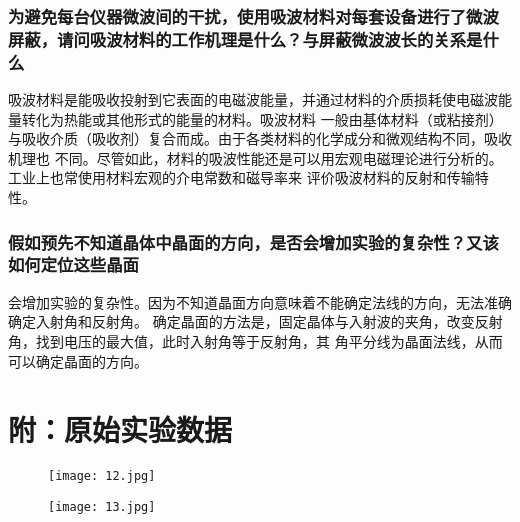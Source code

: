 \documentclass[12pt,a4paper]{article}
\begin{document}
    \subsubsection{为避免每台仪器微波间的干扰，使用吸波材料对每套设备进行了微波屏蔽，请问吸波材料的工作机理是什么？与屏蔽微波波长的关系是什么}
    吸波材料是能吸收投射到它表面的电磁波能量，并通过材料的介质损耗使电磁波能量转化为热能或其他形式的能量的材料。吸波材料
    一般由基体材料（或粘接剂）与吸收介质（吸收剂）复合而成。由于各类材料的化学成分和微观结构不同，吸收机理也
    不同。尽管如此，材料的吸波性能还是可以用宏观电磁理论进行分析的。工业上也常使用材料宏观的介电常数和磁导率来
    评价吸波材料的反射和传输特性。
    \subsubsection{假如预先不知道晶体中晶面的方向，是否会增加实验的复杂性？又该如何定位这些晶面}
    会增加实验的复杂性。因为不知道晶面方向意味着不能确定法线的方向，无法准确确定入射角和反射角。
    确定晶面的方法是，固定晶体与入射波的夹角，改变反射角，找到电压的最大值，此时入射角等于反射角，其
    角平分线为晶面法线，从而可以确定晶面的方向。

\section*{附：原始实验数据}
    \begin{figure}[H]
        \centering
        \texttt{[image: 12.jpg]}
    \end{figure}
    \begin{figure}[H]
        \centering
        \texttt{[image: 13.jpg]}
    \end{figure}
    
  

    
\end{document}
